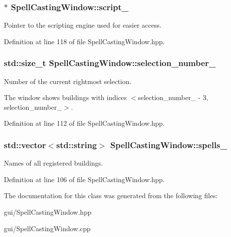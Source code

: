 \subsubsection[{\texorpdfstring{script\+\_\+}{script_}}]{$\ast$ Spell\+Casting\+Window\+::script\+\_\+\hspace{0.3cm}{\ttfamily [private]}}\hypertarget{class_spell_casting_window_ab31a088d48bc14324959e242ea2ff2d2}{}\label{class_spell_casting_window_ab31a088d48bc14324959e242ea2ff2d2}


Pointer to the scripting engine used for easier access. 



Definition at line 118 of file Spell\+Casting\+Window.\+hpp.

\subsubsection[{\texorpdfstring{selection\+\_\+number\+\_\+}{selection_number_}}]{\setlength{\rightskip}{0pt plus 5cm}std\+::size\+\_\+t Spell\+Casting\+Window\+::selection\+\_\+number\+\_\+\hspace{0.3cm}{\ttfamily [private]}}\hypertarget{class_spell_casting_window_a4ddb71ef5c7ca69e952bf49fbb0d41a7}{}\label{class_spell_casting_window_a4ddb71ef5c7ca69e952bf49fbb0d41a7}


Number of the current rightmost selection. 

The window shows buildings with indices $<$selection\+\_\+number\+\_\+ -\/ 3, selection\+\_\+number\+\_\+$>$. 

Definition at line 112 of file Spell\+Casting\+Window.\+hpp.

\subsubsection[{\texorpdfstring{spells\+\_\+}{spells_}}]{\setlength{\rightskip}{0pt plus 5cm}std\+::vector$<$std\+::string$>$ Spell\+Casting\+Window\+::spells\+\_\+\hspace{0.3cm}{\ttfamily [private]}}\hypertarget{class_spell_casting_window_ae155ce0f3e4dd38c6eeadede5d841d62}{}\label{class_spell_casting_window_ae155ce0f3e4dd38c6eeadede5d841d62}


Names of all registered buildings. 



Definition at line 106 of file Spell\+Casting\+Window.\+hpp.



The documentation for this class was generated from the following files\+:\begin{DoxyCompactItemize}
\item 
gui/Spell\+Casting\+Window.\+hpp\item 
gui/Spell\+Casting\+Window.\+cpp\end{DoxyCompactItemize}
